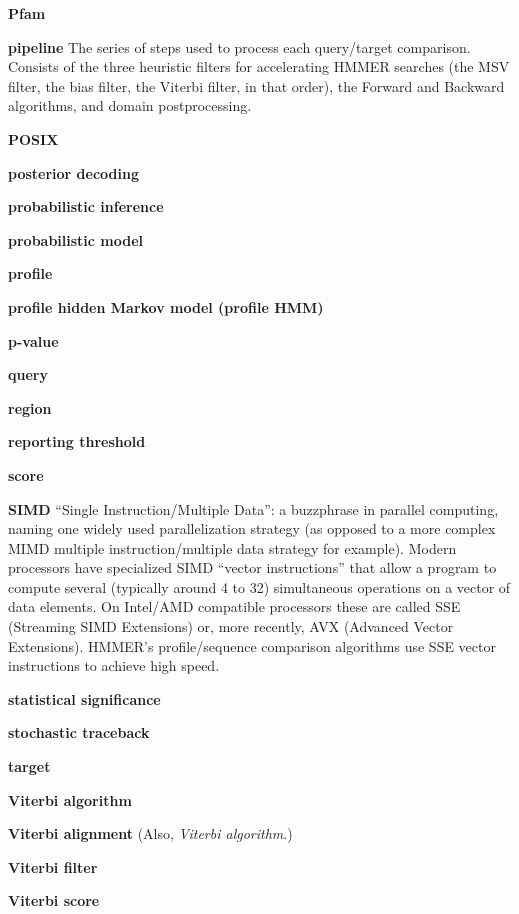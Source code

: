 \begin{wideitem}
\item[\textbf{Pfam}]

\item[\textbf{pipeline}] The series of steps used to process each
query/target comparison. Consists of the three heuristic filters for
accelerating HMMER searches (the MSV filter, the bias filter, the
Viterbi filter, in that order), the Forward and Backward algorithms,
and domain postprocessing.

\item[\textbf{POSIX}]

\item[\textbf{posterior decoding}]

\item[\textbf{probabilistic inference}]

\item[\textbf{probabilistic model}]

\item[\textbf{profile}]

\item[\textbf{profile hidden Markov model (profile HMM)}]

\item[\textbf{p-value}]

\item[\textbf{query}] 

\item[\textbf{region}]

\item[\textbf{reporting threshold}]

\item[\textbf{score}]

\item[\textbf{SIMD}] ``Single Instruction/Multiple Data'': a
  buzzphrase in parallel computing, naming one widely used
  parallelization strategy (as opposed to a more complex MIMD multiple
  instruction/multiple data strategy for example). Modern processors
  have specialized SIMD ``vector instructions'' that allow a program
  to compute several (typically around 4 to 32) simultaneous
  operations on a vector of data elements.  On Intel/AMD compatible
  processors these are called SSE (Streaming SIMD Extensions) or, more
  recently, AVX (Advanced Vector Extensions).  HMMER's
  profile/sequence comparison algorithms use SSE vector instructions
  to achieve high speed.

\item[\textbf{statistical significance}]

\item[\textbf{stochastic traceback}]

\item[\textbf{target}]

\item[\textbf{Viterbi algorithm}]

\item[\textbf{Viterbi alignment}] (Also, \emph{Viterbi algorithm}.)

\item[\textbf{Viterbi filter}]

\item[\textbf{Viterbi score}]




\end{wideitem}

